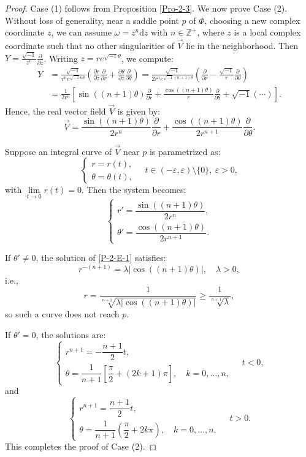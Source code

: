 \documentclass[10pt,a4paper]{amsart}
\begin{document}
\begin{proof}
Case (1) follows from Proposition \ref{Pro-2-3}. We now prove Case (2). Without loss of generality, near a saddle point $p$ of $\Phi$, choosing a new complex coordinate $z$, we can assume $\omega = z^n \mathrm{d}z$ with $n \in \mathbb{Z}^{+}$, where $z$ is a local complex coordinate such that no other singularities of $\vec{V}$ lie in the neighborhood. Then $Y = \frac{\sqrt{-1}}{z^n} \frac{\partial}{\partial z}$. Writing $z = r e^{\sqrt{-1}\theta}$, we compute:
\begin{align*}
Y &= \frac{\sqrt{-1}}{r^n e^{\sqrt{-1}n\theta}} \left( \frac{\partial r}{\partial z} \frac{\partial}{\partial r} + \frac{\partial \theta}{\partial z} \frac{\partial}{\partial \theta} \right)
= \frac{\sqrt{-1}}{2 r^n e^{\sqrt{-1}(n+1)\theta}} \left( \frac{\partial}{\partial r} - \frac{\sqrt{-1}}{r} \frac{\partial}{\partial \theta} \right) \\
&= \frac{1}{2 r^n} \left[ \sin((n+1)\theta) \frac{\partial}{\partial r} + \frac{\cos((n+1)\theta)}{r} \frac{\partial}{\partial \theta} + \sqrt{-1}(\cdots) \right].
\end{align*}
Hence, the real vector field $\vec{V}$ is given by:
\[
\vec{V} = \frac{\sin((n+1)\theta)}{2 r^n} \frac{\partial}{\partial r} + \frac{\cos((n+1)\theta)}{2 r^{n+1}} \frac{\partial}{\partial \theta}.
\]

Suppose an integral curve of $\vec{V}$ near $p$ is parametrized as:
\[
\begin{cases}
r = r(t), \\
\theta = \theta(t),
\end{cases}
\quad t \in (-\varepsilon, \varepsilon) \setminus \{0\},\ \varepsilon > 0,
\]
with $\lim\limits_{t \to 0} r(t) = 0$. Then the system becomes:
\begin{equation}\label{P-2-E-1}
\begin{cases}
r' = \dfrac{\sin((n+1)\theta)}{2 r^n}, \\[10pt]
\theta' = \dfrac{\cos((n+1)\theta)}{2 r^{n+1}}.
\end{cases}
\end{equation}

If $\theta' \neq 0$, the solution of \eqref{P-2-E-1} satisfies:
\[
r^{-(n+1)} = \lambda |\cos((n+1)\theta)|, \quad \lambda > 0,
\]
i.e.,
\[
r = \frac{1}{\sqrt[n+1]{\lambda |\cos((n+1)\theta)|}} \geq \frac{1}{\sqrt[n+1]{\lambda}},
\]
so such a curve does not reach $p$.

If $\theta' = 0$, the solutions are:
\[
\begin{cases}
r^{n+1} = -\dfrac{n+1}{2} t, \\
\theta = \dfrac{1}{n+1} \left[ \dfrac{\pi}{2} + (2k+1)\pi \right], \quad k = 0, \ldots, n,
\end{cases}
\quad t < 0,
\]
and
\[
\begin{cases}
r^{n+1} = \dfrac{n+1}{2} t, \\
\theta = \dfrac{1}{n+1} \left( \dfrac{\pi}{2} + 2k\pi \right), \quad k = 0, \ldots, n,
\end{cases}
\quad t > 0.
\]
This completes the proof of Case (2).
\end{proof}
\end{document}
